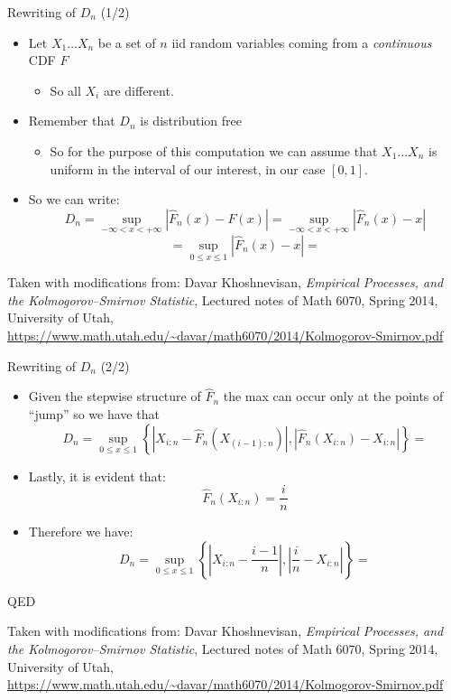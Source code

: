\documentclass{beamer}
\begin{document}
\begin{frame}
{\centerline{Rewriting of $D_n$ (1/2)}}

\begin{itemize}
    \item Let $X_1 \ldots X_n$ be a set of $n$ iid random variables coming from a \textit{continuous} CDF $F$
    \begin{itemize}
    \item So all $X_i$ are different. 
   \end{itemize}
    \item Remember that $D_n$ is distribution free
    \begin{itemize}
    \item So for the purpose of this computation we can assume that $X_1 \ldots X_n$ is uniform in the interval of our interest, in our case $[0,1]$. 
   \end{itemize}
   \item So we can write:
   $$D_{n}=\sup _{-\infty < x < +\infty}|\widehat {F}_{n}(x)-F(x)| = \sup _{-\infty < x < +\infty}|\widehat {F}_{n}(x)-x|  $$
   $$ = \sup _{0 \leq x \leq 1}|\widehat {F}_{n}(x)-x| =  $$

\end{itemize}



\begin{center}
\tiny{Taken with modifications from: Davar Khoshnevisan, \textit{Empirical Processes, and the Kolmogorov–Smirnov Statistic}, Lectured notes of Math 6070, Spring 2014, University of Utah, \url{https://www.math.utah.edu/~davar/math6070/2014/Kolmogorov-Smirnov.pdf}}
\end{center}

\end{frame}

\begin{frame}
{\centerline{Rewriting of $D_n$ (2/2)}}

\begin{itemize}
   \item Given the stepwise structure of $\widehat {F}_{n}$ the max can occur only at the points of ``jump'' so we have that
   $$D_{n}= \sup_{0 \leq x \leq 1} \left \{ |X_{i:n} - \widehat {F}_{n}(X_{(i-1):n})|, |\widehat {F}_{n}(X_{i:n})-X_{i:n}| \right \}=  $$
   \item Lastly, it is evident that:
   $$ \widehat {F}_{n}(X_{i:n}) = \frac{i}{n}$$
   \item Therefore we have:
   $$D_{n}= \sup _{0 \leq x \leq 1}\left \{ |X_{i:n} - \frac{i-1}{n}|, |\frac{i}{n} - X_{i:n}|\right \} =  $$

\end{itemize}
QED



\begin{center}
\tiny{Taken with modifications from: Davar Khoshnevisan, \textit{Empirical Processes, and the Kolmogorov–Smirnov Statistic}, Lectured notes of Math 6070, Spring 2014, University of Utah, \url{https://www.math.utah.edu/~davar/math6070/2014/Kolmogorov-Smirnov.pdf}}
\end{center}

\end{frame}
\end{document}
